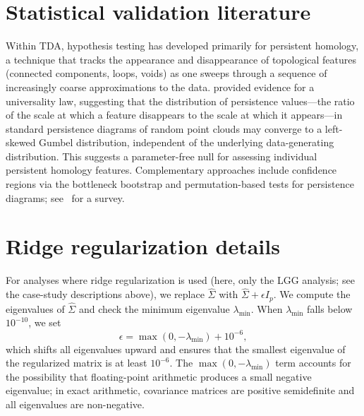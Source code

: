 \documentclass[hidelinks]{siamart251216}
\begin{document}
\section{Statistical validation literature}\label{sm:validation}

Within TDA, hypothesis testing has developed primarily for persistent
homology, a technique that tracks the appearance and disappearance of
topological features (connected components, loops, voids) as one sweeps
through a sequence of increasingly coarse approximations to the data.
\cite{Bobrowski2023} provided evidence for a universality law,
suggesting that the distribution of persistence values---the ratio of the
scale at which a feature disappears to the scale at which it
appears---in standard persistence diagrams of random point clouds may
converge to a left-skewed Gumbel distribution, independent of the
underlying data-generating distribution.
This suggests a parameter-free null for assessing individual persistent
homology features.  Complementary approaches include confidence regions
via the bottleneck bootstrap \citep{CarriereMichelOudot2018} and
permutation-based tests for persistence diagrams; see~\cite{Chazal2021}
for a survey.


\section{Ridge regularization details}\label{supp:ridge}

For analyses where ridge regularization is used (here, only the LGG
analysis; see the case-study descriptions above), we replace
$\hat{\Sigma}$ with $\hat{\Sigma} + \epsilon I_p$.  We compute the
eigenvalues of $\hat{\Sigma}$ and check the minimum eigenvalue
$\lambda_{\min}$.  When $\lambda_{\min}$ falls below $10^{-10}$, we
set
\begin{equation}\label{eq:ridge-epsilon}
  \epsilon = \max(0, -\lambda_{\min}) + 10^{-6},
\end{equation}
which shifts all eigenvalues upward and ensures that the smallest
eigenvalue of the regularized matrix is at least $10^{-6}$.  The
$\max(0, -\lambda_{\min})$ term accounts for the possibility that
floating-point arithmetic produces a small negative eigenvalue; in
exact arithmetic, covariance matrices are positive semidefinite and all
eigenvalues are non-negative.
\end{document}
